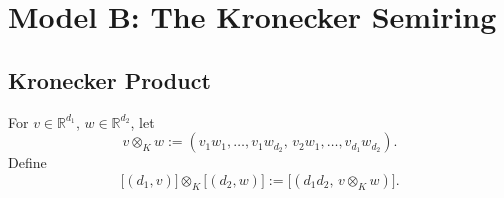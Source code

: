 \section{Model
B: The Kronecker Semiring}
\label{sec:modelB}
\subsection{Kronecker Product}
\begin{definition}
For \(v\in\mathbb R^{d_1}\), \(w\in\mathbb R^{d_2}\), let
\[v\otimes_K w := (v_1w_1,\dots,v_1w_{d_2},\,v_2w_1,\dots,v_{d_1}w_{d_2}).\]
Define
\[\bigl[(d_1,v)\bigr]\otimes_K \bigl[(d_2,w)\bigr] := \bigl[(d_1d_2,\,v\otimes_K w)\bigr].\]
\end{definition}

